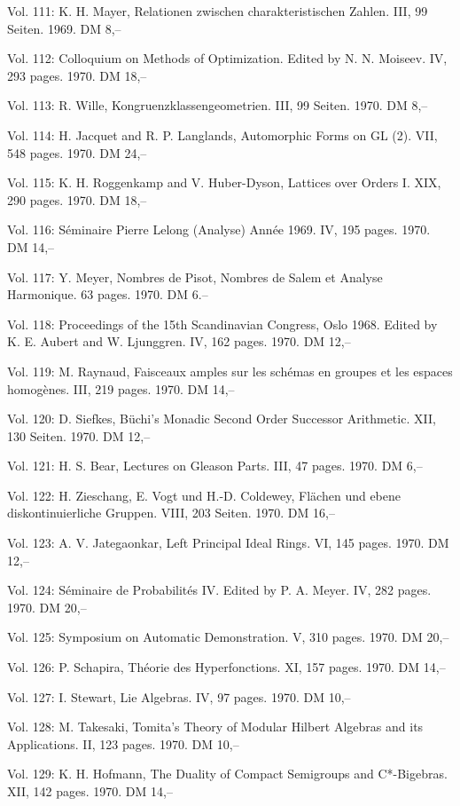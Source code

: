 Vol. 111: K. H. Mayer, Relationen zwischen charakteristischen Zahlen. III, 99 Seiten. 1969. DM 8,--

Vol. 112: Colloquium on Methods of Optimization. Edited by N. N. Moiseev. IV, 293 pages. 1970. DM 18,--

Vol. 113: R. Wille, Kongruenzklassengeometrien. III, 99 Seiten. 1970. DM 8,--

Vol. 114: H. Jacquet and R. P. Langlands, Automorphic Forms on GL (2). VII, 548 pages. 1970. DM 24,--

Vol. 115: K. H. Roggenkamp and V. Huber-Dyson, Lattices over Orders I. XIX, 290 pages. 1970. DM 18,--

Vol. 116: Séminaire Pierre Lelong (Analyse) Année 1969. IV, 195 pages. 1970. DM 14,--

Vol. 117: Y. Meyer, Nombres de Pisot, Nombres de Salem et Analyse Harmonique. 63 pages. 1970. DM 6.--

Vol. 118: Proceedings of the 15th Scandinavian Congress, Oslo 1968. Edited by K. E. Aubert and W. Ljunggren. IV, 162 pages. 1970. DM 12,--

Vol. 119: M. Raynaud, Faisceaux amples sur les schémas en groupes et les espaces homogènes. III, 219 pages. 1970. DM 14,--

Vol. 120: D. Siefkes, Büchi's Monadic Second Order Successor Arithmetic. XII, 130 Seiten. 1970. DM 12,--

Vol. 121: H. S. Bear, Lectures on Gleason Parts. III, 47 pages. 1970. DM 6,--

Vol. 122: H. Zieschang, E. Vogt und H.-D. Coldewey, Flächen und ebene diskontinuierliche Gruppen. VIII, 203 Seiten. 1970. DM 16,--

Vol. 123: A. V. Jategaonkar, Left Principal Ideal Rings. VI, 145 pages. 1970. DM 12,--

Vol. 124: Séminaire de Probabilités IV. Edited by P. A. Meyer. IV, 282 pages. 1970. DM 20,--

Vol. 125: Symposium on Automatic Demonstration. V, 310 pages. 1970. DM 20,--

Vol. 126: P. Schapira, Théorie des Hyperfonctions. XI, 157 pages. 1970. DM 14,--

Vol. 127: I. Stewart, Lie Algebras. IV, 97 pages. 1970. DM 10,--

Vol. 128: M. Takesaki, Tomita's Theory of Modular Hilbert Algebras and its Applications. II, 123 pages. 1970. DM 10,--

Vol. 129: K. H. Hofmann, The Duality of Compact Semigroups and C*-Bigebras. XII, 142 pages. 1970. DM 14,--


